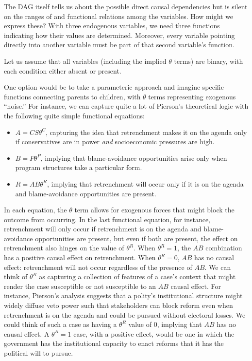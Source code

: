 \documentclass[
  12pt,
]{book}
\providecommand{\tightlist}{%
  \setlength{\itemsep}{0pt}\setlength{\parskip}{0pt}}
\begin{document}
The DAG itself tells us about the possible direct causal dependencies but is silent on the ranges of and functional relations among the variables. How might we express these? With three endogenous variables, we need three functions indicating how their values are determined. Moreover, every variable pointing directly into another variable must be part of that second variable's function.

Let us assume that all variables (including the implied \(\theta\) terms) are binary, with each condition either absent or present.

One option would be to take a parameteric approach and imagine specific functions connecting parents to children, with \(\theta\) terms representing exogenous ``noise.'' For instance, we can capture quite a lot of Pierson's theoretical logic with the following quite simple functional equations:

\begin{itemize}
\tightlist
\item
  \(A=CS\theta^C\), capturing the idea that retrenchment makes it on the agenda only if conservatives are in power \emph{and} socioeconomic pressures are high.
\item
  \(B=P\theta^P\), implying that blame-avoidance opportunities arise only when program structures take a particular form.
\item
  \(R=AB\theta^R\), implying that retrenchment will occur only if it is on the agenda and blame-avoidance opportunities are present.
\end{itemize}

In each equation, the \(\theta\) term allows for exogenous forces that might block the outcome from occurring. In the last functional equation, for instance, retrenchment will only occur if retrenchment is on the agenda and blame-avoidance opportunities are present, but even if both are present, the effect on retrenchment also hinges on the value of \(\theta^R\). When \(\theta^R=1\), the \(AB\) combination has a positive causal effect on retrenchment. When \(\theta^R=0\), \(AB\) has no causal effect: retrenchment will not occur regardless of the presence of \(AB\). We can think of \(\theta^R\) as capturing a collection of features of a case's context that might render the case susceptible or not susceptible to an \(AB\) causal effect. For instance, Pierson's analysis suggests that a polity's institutional structure might widely diffuse veto power such that stakeholders can block reform even when retrenchment is on the agenda and could be pursued without electoral losses. We could think of such a case as having a \(\theta^R\) value of 0, implying that \(AB\) has no causal effect. A \(\theta^R=1\) case, with a positive effect, would be one in which the government has the institutional capacity to enact reforms that it has the political will to pursue.
\end{document}
